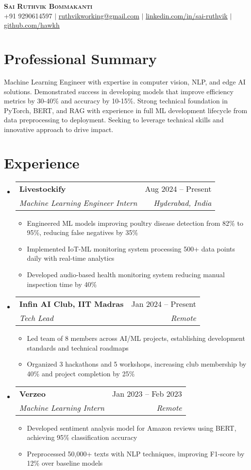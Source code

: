 \documentclass[letterpaper,10.8pt]{article}
\makeatletter
\newcommand{\resumeItem}[1]{
  \item\small{#1}
}
\newcommand{\resumeSubheading}[4]{
  \item
    \begin{tabular*}{0.97\textwidth}[t]{l@{\extracolsep{\fill}}r}
      \textbf{#1} & #2 \\
      \textit{\small#3} & \textit{\small #4} \\
    \end{tabular*}\vspace{-3pt}
}
\newcommand{\resumeSubHeadingListStart}{\begin{itemize}[leftmargin=0.15in, label={}, itemsep=2pt]}
\newcommand{\resumeSubHeadingListEnd}{\end{itemize}\vspace{0pt}}
\newcommand{\resumeItemListStart}{\begin{itemize}[leftmargin=*,itemsep=2pt,parsep=0pt,topsep=1pt]}
\newcommand{\resumeItemListEnd}{\end{itemize}\vspace{0pt}}
\makeatother
\begin{document}
\begin{center}
    \textbf{\Large \scshape Sai Ruthvik Bommakanti} \\ \vspace{1pt}
    \small +91 9290614597 $|$ \href{mailto:ruthvikworking@gmail.com}{ruthvikworking@gmail.com} $|$ 
    \href{https://linkedin.com/in/sai-ruthvik-6b880a213}{{\underline{linkedin.com/in/sai-ruthvik}}} $|$
    \href{https://github.com/hawkh}{{\underline{github.com/hawkh}}}
\end{center}

\section{Professional Summary}
\small{Machine Learning Engineer with expertise in computer vision, NLP, and edge AI solutions. Demonstrated success in developing models that improve efficiency metrics by 30-40\% and accuracy by 10-15\%. Strong technical foundation in PyTorch, BERT, and RAG with experience in full ML development lifecycle from data preprocessing to deployment. Seeking to leverage technical skills and innovative approach to drive impact.}

\section{Experience}
  \resumeSubHeadingListStart
    \resumeSubheading
      {Livestockify}{Aug 2024 -- Present}
      {Machine Learning Engineer Intern}{Hyderabad, India}
      \resumeItemListStart
        \resumeItem{Engineered ML models improving poultry disease detection from 82\% to 95\%, reducing false negatives by 35\%}
        \resumeItem{Implemented IoT-ML monitoring system processing 500+ data points daily with real-time analytics}
        \resumeItem{Developed audio-based health monitoring system reducing manual inspection time by 40\%}
      \resumeItemListEnd
    \resumeSubheading
      {Infin AI Club, IIT Madras}{Jan 2024 -- Present}
      {Tech Lead}{Remote}
      \resumeItemListStart
          \resumeItem{Led team of 8 members across AI/ML projects, establishing development standards and technical roadmaps}
          \resumeItem{Organized 3 hackathons and 5 workshops, increasing club membership by 40\% and project completion by 25\%}
      \resumeItemListEnd
    \resumeSubheading
      {Verzeo}{Jan 2023 -- Feb 2023}
      {Machine Learning Intern}{Remote}
      \resumeItemListStart
          \resumeItem{Developed sentiment analysis model for Amazon reviews using BERT, achieving 95\% classification accuracy}
          \resumeItem{Preprocessed 50,000+ texts with NLP techniques, improving F1-score by 12\% over baseline models}
      \resumeItemListEnd
  \resumeSubHeadingListEnd
\end{document}
